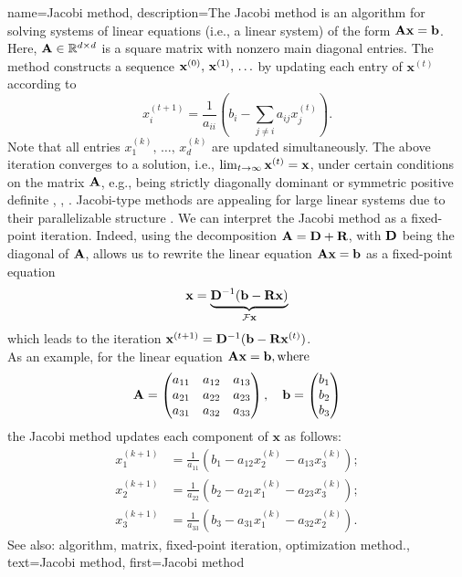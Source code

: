 {
{name={Jacobi method},
	description={The Jacobi method is an algorithm  
		for solving systems of linear equations (i.e., a linear system) of the form ${\bf A}{\bf x}= \mathbf{b}$.  
		Here, ${\bf A} \in \mathbb{R}^{d \times d}$ is a square matrix with 
		nonzero main diagonal entries. The method constructs a sequence ${\bf x}^{(0)}, \,{\bf x}^{(1)}, \,\ldots$ 
		by updating each entry of $\mathbf{x}^{(t)}$ according to 
		\[
		x_i^{(t+1)} = \frac{1}{a_{ii}} \left( b_i - \sum_{j \neq i} a_{ij} x_j^{(t)} \right).
		\]
		Note that all entries $x^{(k)}_{1}, \,\ldots, \,x^{(k)}_{d}$ are updated simultaneously.
		The above iteration converges to a solution, i.e., $\lim_{t \rightarrow \infty} {\bf x}^{(t)}={\bf x}$, 
		under certain conditions on the matrix ${\bf A}$, e.g., being strictly 
		diagonally dominant or symmetric positive  definite \cite{GolubVanLoanBook}, \cite{StrangLinAlg2016}, \cite{Horn91}. 
		Jacobi-type methods are appealing for large linear systems due to their parallelizable structure \cite{ParallelDistrBook}.
		We can interpret the Jacobi method as a fixed-point iteration. Indeed, using the decomposition ${\bf A} = {\bf D} + {\bf R}$, with ${\bf D}$ being the 
		diagonal of ${\bf A}$, allows us to rewrite the linear equation ${\bf A} {\bf x} = {\bf b}$ as a fixed-point equation  
		\[
		\mathbf{x} = \underbrace{{\bf D}^{-1}(\mathbf{b} - {\bf R} \mathbf{x})}_{\mathcal{F} {\bf x}}
		\]
		which leads to the iteration ${\bf x}^{(t+1)} = {\bf D}^{-1}(\mathbf{b} - {\bf R} {\bf x}^{(t)})$.
		\\
		As an example, for the linear equation ${\bf A} \mathbf{x} = \mathbf{b}, \text{where}$
		 \[
		 {\bf A} = \begin{pmatrix}
		 	a_{11} & a_{12} & a_{13} \\
		 	a_{21} & a_{22} & a_{23} \\
		 	a_{31} & a_{32} & a_{33}
		 \end{pmatrix}, \quad
		 \mathbf{b} = \begin{pmatrix}
		 	b_1 \\
		 	b_2 \\
		 	b_3
		 \end{pmatrix}
		 \]
		 the Jacobi method updates each component of \( \mathbf{x} \) as follows:
		 \[
		 \begin{aligned}
		 	x_1^{(k+1)} &= \frac{1}{a_{11}} \left( b_1 - a_{12} x_2^{(k)} - a_{13} x_3^{(k)} \right); \\
		 	x_2^{(k+1)} &= \frac{1}{a_{22}} \left( b_2 - a_{21} x_1^{(k)} - a_{23} x_3^{(k)} \right); \\
		 	x_3^{(k+1)} &= \frac{1}{a_{33}} \left( b_3 - a_{31} x_1^{(k)} - a_{32} x_2^{(k)} \right).
		 \end{aligned}
		 \]
		See also: algorithm, matrix, fixed-point iteration, optimization method.},
	text={Jacobi method}, 
	first={Jacobi method}
}
	
}
